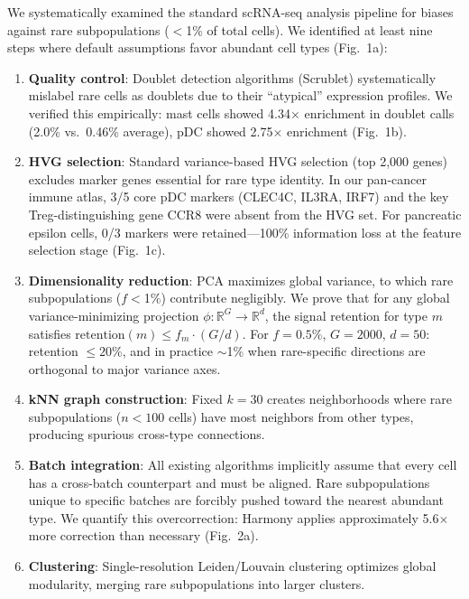 \documentclass[10pt]{article}
\begin{document}
We systematically examined the standard scRNA-seq analysis pipeline for biases against rare subpopulations ($<$1\% of total cells). We identified at least nine steps where default assumptions favor abundant cell types (Fig.~1a):

\begin{enumerate}
\item \textbf{Quality control}: Doublet detection algorithms (Scrublet) systematically mislabel rare cells as doublets due to their ``atypical'' expression profiles. We verified this empirically: mast cells showed 4.34$\times$ enrichment in doublet calls (2.0\% vs.\ 0.46\% average), pDC showed 2.75$\times$ enrichment (Fig.~1b).

\item \textbf{HVG selection}: Standard variance-based HVG selection (top 2,000 genes) excludes marker genes essential for rare type identity. In our pan-cancer immune atlas, 3/5 core pDC markers (CLEC4C, IL3RA, IRF7) and the key Treg-distinguishing gene CCR8 were absent from the HVG set. For pancreatic epsilon cells, 0/3 markers were retained---100\% information loss at the feature selection stage (Fig.~1c).

\item \textbf{Dimensionality reduction}: PCA maximizes global variance, to which rare subpopulations ($f<$1\%) contribute negligibly. We prove that for any global variance-minimizing projection $\phi: \mathbb{R}^G \to \mathbb{R}^d$, the signal retention for type $m$ satisfies $\text{retention}(m) \leq f_m \cdot (G/d)$. For $f=0.5\%$, $G=2000$, $d=50$: retention $\leq 20\%$, and in practice $\sim$1\% when rare-specific directions are orthogonal to major variance axes.

\item \textbf{kNN graph construction}: Fixed $k=30$ creates neighborhoods where rare subpopulations ($n<100$ cells) have most neighbors from other types, producing spurious cross-type connections.

\item \textbf{Batch integration}: All existing algorithms implicitly assume that every cell has a cross-batch counterpart and must be aligned. Rare subpopulations unique to specific batches are forcibly pushed toward the nearest abundant type. We quantify this overcorrection: Harmony applies approximately 5.6$\times$ more correction than necessary (Fig.~2a).

\item \textbf{Clustering}: Single-resolution Leiden/Louvain clustering optimizes global modularity, merging rare subpopulations into larger clusters.


\end{enumerate}
\end{document}
